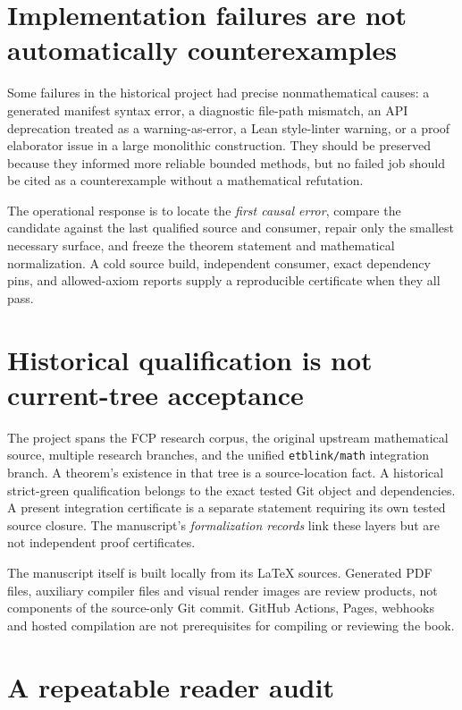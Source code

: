 \section{Implementation failures are not automatically counterexamples}

Some failures in the historical project had precise nonmathematical
causes: a generated manifest syntax error, a diagnostic file-path
mismatch, an API deprecation treated as a warning-as-error, a Lean
style-linter warning, or a proof elaborator issue in a large monolithic
construction. They should be preserved because they informed more
reliable bounded methods, but no failed job should be cited as a
counterexample without a mathematical refutation.

The operational response is to locate the \emph{first causal error},
compare the candidate against the last qualified source and consumer,
repair only the smallest necessary surface, and freeze the theorem
statement and mathematical normalization. A cold source build,
independent consumer, exact dependency pins, and allowed-axiom
reports supply a reproducible certificate when they all pass.

\section{Historical qualification is not current-tree acceptance}

The project spans the FCP research corpus, the original upstream
mathematical source, multiple research branches, and the unified
\texttt{etblink/math} integration branch. A theorem's existence in
that tree is a source-location fact. A historical strict-green
qualification belongs to the exact tested Git object and dependencies.
A present integration certificate is a separate statement requiring
its own tested source closure. The manuscript's \emph{formalization
records} link these layers but are not independent proof certificates.

The manuscript itself is built locally from its \LaTeX{} sources.
Generated PDF files, auxiliary compiler files and visual render
images are review products, not components of the source-only Git
commit. GitHub Actions, Pages, webhooks and hosted compilation are
not prerequisites for compiling or reviewing the book.

\section{A repeatable reader audit}

